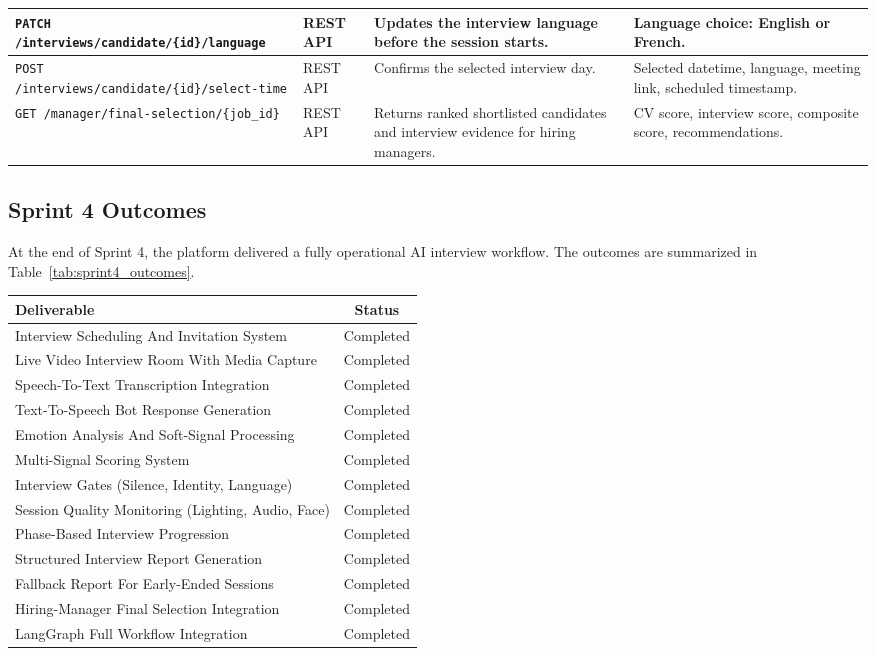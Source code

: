 \begin{spacing}{1.1}
\begin{center}
\begin{tabularx}{\textwidth}{|p{4cm}|p{2.3cm}|X|p{3.8cm}|}
\texttt{PATCH /interviews/candidate/\{id\}/language} & REST API & Updates the interview language before the session starts. & Language choice: English or French. \\ \hline
\texttt{POST /interviews/candidate/\{id\}/select-time} & REST API & Confirms the selected interview day. & Selected datetime, language, meeting link, scheduled timestamp. \\ \hline
\texttt{GET /manager/final-selection/\{job\_id\}} & REST API & Returns ranked shortlisted candidates and interview evidence for hiring managers. & CV score, interview score, composite score, recommendations. \\ \hline

\end{tabularx}
\end{center}
\end{spacing}

\subsection{Sprint 4 Outcomes}
\label{sec:sprint4:outcomes}

At the end of Sprint 4, the platform delivered a fully operational AI interview workflow. The outcomes are summarized in Table~\ref{tab:sprint4_outcomes}.

\begin{center}
\label{tab:sprint4_outcomes}
\renewcommand{\arraystretch}{0.8}

\begin{tabular}{|l|c|}
\hline
\rowcolor{gray!20} \textbf{Deliverable} & \textbf{Status} \\
\hline
Interview Scheduling And Invitation System & Completed \\
\hline
Live Video Interview Room With Media Capture & Completed \\
\hline
Speech-To-Text Transcription Integration & Completed \\
\hline
Text-To-Speech Bot Response Generation & Completed \\
\hline
Emotion Analysis And Soft-Signal Processing & Completed \\
\hline
Multi-Signal Scoring System & Completed \\
\hline
Interview Gates (Silence, Identity, Language) & Completed \\
\hline
Session Quality Monitoring (Lighting, Audio, Face) & Completed \\
\hline
Phase-Based Interview Progression & Completed \\
\hline
Structured Interview Report Generation & Completed \\
\hline
Fallback Report For Early-Ended Sessions & Completed \\
\hline
Hiring-Manager Final Selection Integration & Completed \\
\hline
LangGraph Full Workflow Integration & Completed \\
\hline
\end{tabular}
\end{center}

